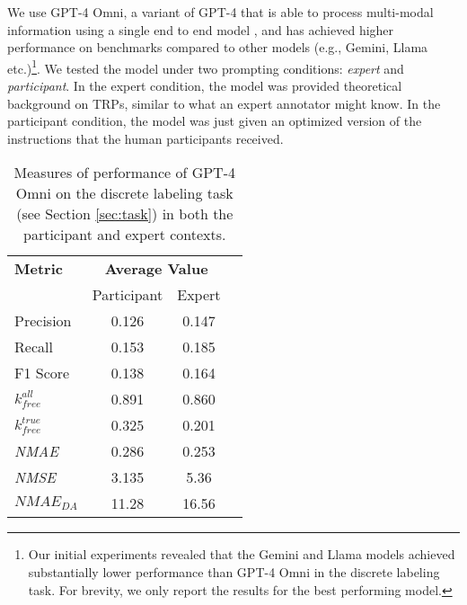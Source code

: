 We use GPT-4 Omni, a variant of GPT-4 that is able to process multi-modal information using a single end to end model \cite{achiam2023gpt}, and has achieved higher performance on benchmarks compared to other models (e.g., Gemini, Llama etc.)\footnote{Our initial experiments revealed that the Gemini and Llama models achieved substantially lower performance than GPT-4 Omni in the discrete labeling task. For brevity, we only report the results for the best performing model.}. We tested the model under two prompting conditions: \emph{expert} and \emph{participant}. In the expert condition, the model was provided theoretical background on TRPs, similar to what an expert annotator might know. In the participant condition, the model was just given an optimized version of the instructions that the human participants received.

\begin{table}[htp!]
    \centering
    \renewcommand{\arraystretch}{1.2}
    \begin{tabular}{lccc }
        \textbf{Metric}      & \multicolumn{2}{c}{\textbf{Average Value}}\vspace{1mm}          \\
                             & Participant                                            & Expert \\
        \hline
        Precision            & 0.126                                                  & 0.147  \\
        Recall               & 0.153                                                  & 0.185  \\
        F1 Score             & 0.138                                                  & 0.164  \\
        $k_{free}^{all}$     & 0.891                                                  & 0.860  \\
        $k_{free}^{true}$    & 0.325                                                  & 0.201  \\
        \textit{NMAE}        & 0.286                                                  & 0.253  \\
        \textit{NMSE}        & 3.135                                                  & 5.36   \\
        $\textit{NMAE}_{DA}$ & 11.28                                                  & 16.56  \\
    \end{tabular}
    \caption{Measures of performance of GPT-4 Omni on the discrete labeling task (see Section \ref{sec:task}) in both the participant and expert contexts.}
    \label{tab:results}
\end{table}


